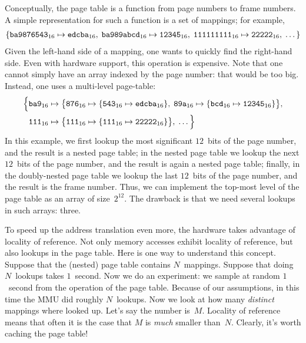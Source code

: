 Conceptually,
  the page table is a function from page numbers to frame numbers.
A simple representation for such a function is a set of mappings; for example,
\begin{align*}
  \{
  {\tt ba9876543}_{16} \mapsto {\tt edcba}_{16},\;
  {\tt ba989abcd}_{16} \mapsto {\tt 12345}_{16},\;
  {\tt 111111111}_{16} \mapsto {\tt 22222}_{16},\;
  \dots
  \}
\end{align*}
Given the left-hand side of a mapping, one wants to quickly find the right-hand side.
Even with hardware support, this operation is expensive.
Note that one cannot simply have an array indexed by the page number:
  that would be too big.
Instead, one uses a multi-level page-table:
\begin{align*}
\begin{aligned}
  \Bigl\{
    {\tt ba9}_{16} &\mapsto
      \bigl\{
        {\tt 876}_{16} \mapsto \{ {\tt 543}_{16} \mapsto {\tt edcba}_{16}\},\;
        {\tt 89a}_{16} \mapsto \{ {\tt bcd}_{16} \mapsto {\tt 12345}_{16}\}
      \bigr\},\\
    {\tt 111}_{16} &\mapsto
      \bigl\{
        {\tt 111}_{16} \mapsto \{ {\tt 111}_{16} \mapsto {\tt 22222}_{16} \}
      \bigr\},\;
    \dots
  \Bigr\}
\end{aligned}
\end{align*}
In this example, we first lookup the most significant $12$~bits of the page number,
  and the result is a nested page table;
  in the nested page table we lookup the next $12$~bits of the page number,
  and the result is again a nested page table;
  finally, in the doubly-nested page table we lookup the last $12$~bits of the page number,
  and the result is the frame number.
Thus,
  we can implement the top-most level of the page table as an array of size~$2^{12}$.
The drawback is that we need several lookups in such arrays: three.

To speed up the address translation even more,
  the hardware takes advantage of locality of reference.
Not only memory accesses exhibit locality of reference,
  but also lookups in the page table.
Here is one way to understand this concept.
Suppose that the (nested) page table contains $N$~mappings.
Suppose that doing $N$~lookups takes $1$~second.
Now we do an experiment:
  we sample at random $1$~second from the operation of the page table.
Because of our assumptions, in this time the MMU did roughly $N$~lookups.
Now we look at how many \emph{distinct} mappings where looked up.
Let's say the number is~$M$.
Locality of reference means that often it is the case
  that $M$ is \emph{much} smaller than~$N$.
Clearly, it's worth caching the page table!

